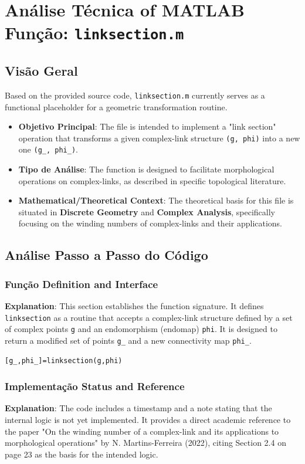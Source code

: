 

\chapter{Análise Técnica of MATLAB Função: \texttt{linksection.m}}
\section{Visão Geral}

Based on the provided source code, \texttt{linksection.m} currently serves as a functional placeholder for a geometric transformation routine.

\begin{itemize}
    \item \textbf{Objetivo Principal}: The file is intended to implement a "link section" operation that transforms a given complex-link structure \texttt{(g, phi)} into a new one \texttt{(g\_, phi\_)}.
    \item \textbf{Tipo de Análise}: The function is designed to facilitate morphological operations on complex-links, as described in specific topological literature.
    \item \textbf{Mathematical/Theoretical Context}: The theoretical basis for this file is situated in \textbf{Discrete Geometry} and \textbf{Complex Analysis}, specifically focusing on the winding numbers of complex-links and their applications.
\end{itemize}

\section{Análise Passo a Passo do Código}

\subsection{Função Definition and Interface}
\textbf{Explanation}: This section establishes the function signature. It defines 
\texttt{linksection} as a routine that accepts a complex-link structure defined by a set of complex points 
\texttt{g} and an endomorphism (endomap) 
\texttt{phi}. It is designed to return a modified set of points 
\texttt{g\_} and a new connectivity map 
\texttt{phi\_}.

\begin{lstlisting}
[g_,phi_]=linksection(g,phi)
\end{lstlisting}

\subsection{Implementação Status and Reference}
\textbf{Explanation}: The code includes a timestamp and a note stating that the internal logic is not yet implemented. It provides a direct academic reference to the paper "On the winding number of a complex-link and its applications to morphological operations" by N. Martins-Ferreira (2022), citing Section 2.4 on page 23 as the basis for the intended logic.

